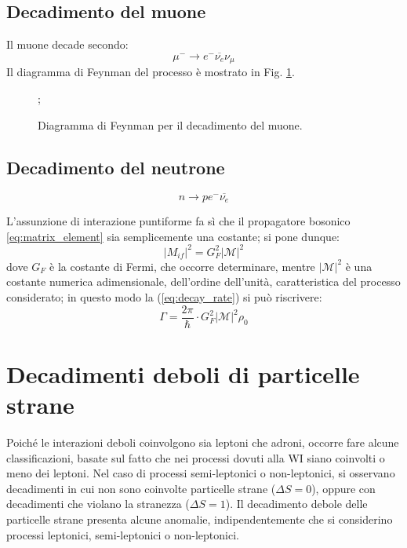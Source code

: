 \documentclass{subnucbo}
\begin{document}
\subsection{Decadimento del muone}
Il muone decade secondo:
\begin{equation}
        \mu^{-} \rightarrow e^{-} \overline{\nu_{e}} \nu_{\mu}
        \label{eq:muon_decay}
\end{equation}
Il diagramma di Feynman del processo è mostrato in Fig. \ref{fig:muon_decay}.
\begin{figure}[!h]
        \centering
        ;
        \caption{Diagramma di Feynman per il decadimento del muone.}
        \label{fig:muon_decay}
\end{figure}



\subsection{Decadimento del neutrone}

\begin{equation}
        n \rightarrow p e^{-} \overline{\nu_{e}}
        \label{eq:neutron_decay}
\end{equation}

L'assunzione di interazione puntiforme fa sì che il propagatore bosonico \ref{eq:matrix_element} sia semplicemente una costante; si pone dunque:
\begin{equation}
        |M_{if}|^{2} = G_{F}^{2}|\mathcal{M}|^{2}
        \label{eq:mat_element_fermi_const}
\end{equation}
dove $G_{F}$ è la costante di Fermi, che occorre determinare, mentre $|\mathcal{M}|^{2}$ è una costante numerica adimensionale, dell'ordine dell'unità, caratteristica del processo considerato; in questo modo la (\ref{eq:decay_rate}) si può riscrivere:
\begin{equation}
        \Gamma = \frac{2 \pi} {\hbar} \cdot G_{F}^{2}|\mathcal{M}|^{2} \rho_{0}
        \label{eq:decay_rate_neutron}
\end{equation}


\section{Decadimenti deboli di particelle strane}
Poiché le interazioni deboli coinvolgono sia leptoni che adroni, occorre fare alcune classificazioni, basate sul fatto che nei processi dovuti alla WI siano coinvolti o meno dei leptoni. Nel caso di processi semi-leptonici o non-leptonici, si osservano decadimenti in cui non sono coinvolte particelle strane ($\Delta S=0$), oppure con decadimenti che violano la stranezza ($\Delta S=1$). Il decadimento debole delle particelle strane presenta alcune anomalie, indipendentemente che si considerino processi leptonici, semi-leptonici o non-leptonici.
\end{document}

